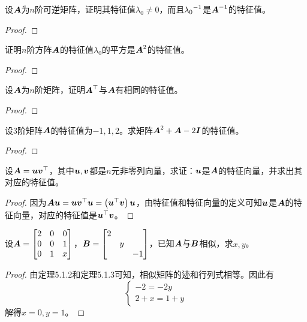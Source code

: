 \begin{problem}
设\(\boldsymbol{A}\)为\(n\)阶可逆矩阵，证明其特征值\(\lambda_0\neq0\)，而且\({\lambda_0}^{-1}\)是\({\boldsymbol{A}}^{-1}\)的特征值。
\end{problem}
\begin{proof}
\end{proof}

\begin{problem}
证明\(n\)阶方阵\(\boldsymbol{A}\)的特征值\(\lambda_0\)的平方是\(\boldsymbol{A}^2\)的特征值。
\end{problem}
\begin{proof}
\end{proof}

\begin{problem}
设\(\boldsymbol{A}\)为\(n\)阶矩阵，证明\(\boldsymbol{A}^\top\)与\(\boldsymbol{A}\)有相同的特征值。
\end{problem}
\begin{proof}
\end{proof}

\begin{problem}
设\(3\)阶矩阵\(\boldsymbol{A}\)的特征值为\(-1,1,2\)。求矩阵\(\boldsymbol{A}^2+\boldsymbol{A}-2\boldsymbol{I}\)的特征值。
\end{problem}
\begin{proof}
\end{proof}

\begin{problem}
设\(\boldsymbol{A}=\boldsymbol{u}\boldsymbol{v}^\top\)，其中\(\boldsymbol{u},\boldsymbol{v}\)都是\(n\)元非零列向量，求证：\(\boldsymbol{u}\)是\(\boldsymbol{A}\)的特征向量，并求出其对应的特征值。
\end{problem}
\begin{proof}
    因为\(\boldsymbol{A}\boldsymbol{u}=\boldsymbol{u}\boldsymbol{v}^\top\boldsymbol{u}=\left( \boldsymbol{u}^\top\boldsymbol{v} \right)\boldsymbol{u}\)，由特征值和特征向量的定义可知\(\boldsymbol{u}\)是\(\boldsymbol{A}\)的特征向量，对应的特征值是\(\boldsymbol{u}^\top\boldsymbol{v}\)。
\end{proof}

\begin{problem}
设\(\boldsymbol{A}=\begin{bmatrix}2&0&0\\0&0&1\\0&1&x\end{bmatrix}\)，\(\boldsymbol{B}=\begin{bmatrix}2&&\\&y&\\&&-1\end{bmatrix}\)，已知\(\boldsymbol{A}\)与\(\boldsymbol{B}\)相似，求\(x,y\)。
\end{problem}
\begin{proof}
    由定理5.1.2和定理5.1.3可知，相似矩阵的迹和行列式相等。因此有
    \begin{equation*}
        \begin{cases}
            -2=-2y \\
            2+x=1+y
        \end{cases}
    \end{equation*}
    解得\(x=0,y=1\)。
\end{proof}

